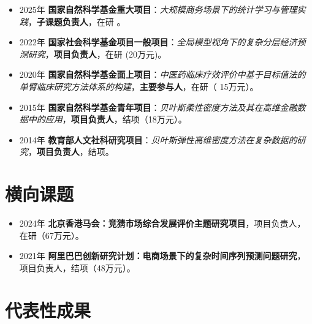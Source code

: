 \documentclass[twoside,a4paper,11pt]{article}
\begin{document}
\begin{itemize}

\item 2025年 \textbf{国家自然科学基金重大项目}：\emph{大规模商务场景下的统计学习与管理实践}，\textbf{子课题负责人}，在研 。

\item 2022年 \textbf{国家社会科学基金项目一般项目}：\emph{全局模型视角下的复杂分层经济预测研究}，\textbf{项目负责人}，在研 (20万元)。

\item 2020年 \textbf{国家自然科学基金面上项目}：\emph{中医药临床疗效评价中基于目标值法的单臂临床研究方法体系的构建}，\textbf{主要参与人}，在研（ 15万元）。

\item 2015年 \textbf{国家自然科学基金青年项目}：\emph{贝叶斯柔性密度方法及其在高维金融数据中的应用}，\textbf{项目负责人}，结项（18万元）。

\item 2014年 \textbf{教育部人文社科研究项目}：\emph{贝叶斯弹性高维密度方法在复杂数据的研究}，\textbf{项目负责人}，结项。

\end{itemize}

\section{横向课题}
\begin{itemize}

\item 2024年 \textbf{北京香港马会：竞猜市场综合发展评价主题研究项目}，项目负责人，在研（67万元）。

\item 2021年 \textbf{阿里巴巴创新研究计划：电商场景下的复杂时间序列预测问题研究}，项目负责人，结项（48万元）。

\end{itemize}

\section{代表性成果}
\begin{refsection}
\nocite{HuangY2024LocalInformation}
\nocite{ZhangB2023OptimalReconciliation}
\nocite{KangY2022ForecastForecasts}
\nocite{ZhuX2021LeastSquareApproximation}
\nocite{LiF2018ImprovingForecasting}
\printbibliography[heading=none]
\end{refsection}
\end{document}
